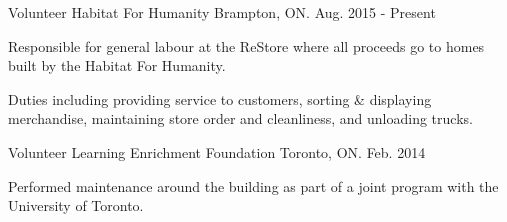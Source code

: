 

\begin{cventries}

  \cventry
    {Volunteer} %
    {Habitat For Humanity} %
    {Brampton, ON.} %
    {Aug. 2015 - Present} %
    {
      \begin{cvitems} %
        \item {Responsible for general labour at the ReStore where all proceeds go to homes built by the Habitat For Humanity.}
        \item {Duties including providing service to customers, sorting \& displaying merchandise, maintaining store order and cleanliness, and unloading trucks.}
      \end{cvitems}
    }

  \cventry
    {Volunteer} %
    {Learning Enrichment Foundation} %
    {Toronto, ON.} %
    {Feb. 2014} %
    {
      \begin{cvitems} %
        \item {Performed maintenance around the building as part of a joint program with the University of Toronto.}
      \end{cvitems}
    }

\end{cventries}

